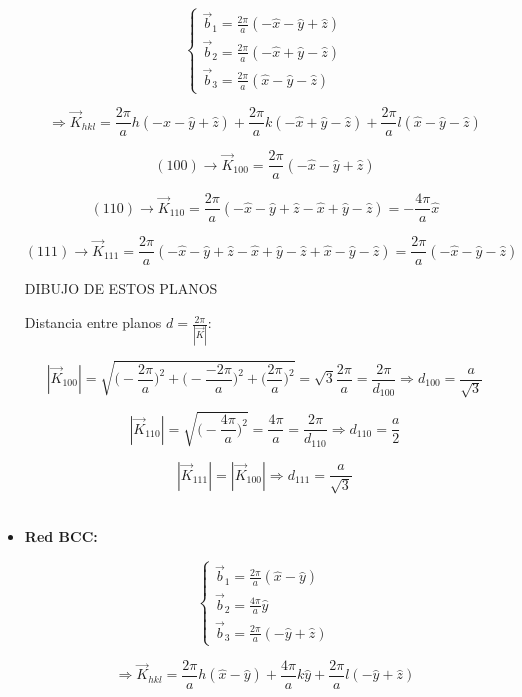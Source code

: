 \documentclass[a4paper]{article}
\begin{document}
\begin{itemize}
$$\begin{cases}
\vec{b}_{1} = \frac{2 \pi}{a}(-\hat{x} - \hat{y} + \hat{z})\\
\vec{b}_{2} = \frac{2 \pi}{a}(-\hat{x} + \hat{y} - \hat{z}) \\
\vec{b}_{3} = \frac{2 \pi}{a}(\hat{x} - \hat{y} - \hat{z})
\end{cases}$$

$$\Rightarrow \vec{K}_{hkl} = \frac{2 \pi}{a}h(-\hat{x} - \hat{y} + \hat{z}) + \frac{2 \pi}{a}k(-\hat{x} + \hat{y} - \hat{z}) + \frac{2 \pi}{a}l(\hat{x} - \hat{y} - \hat{z})$$



$$(100) \rightarrow \vec{K}_{100} = \frac{2 \pi}{a}(-\hat{x} - \hat{y} + \hat{z})$$

$$(110) \rightarrow \vec{K}_{110} = \frac{2 \pi}{a}(-\hat{x} - \hat{y} + \hat{z} -\hat{x} + \hat{y} - \hat{z}) = -\frac{4 \pi}{a}\hat{x}$$

$$(111) \rightarrow \vec{K}_{111} = \frac{2 \pi}{a}(-\hat{x} - \hat{y} + \hat{z} -\hat{x} + \hat{y} - \hat{z} + \hat{x} - \hat{y} - \hat{z}) = \frac{2 \pi}{a}(-\hat{x} - \hat{y} - \hat{z})$$

DIBUJO DE ESTOS PLANOS

Distancia entre planos $d = \frac{2\pi}{|\vec{K}|}$:

$$| \vec{K}_{100} | = \sqrt{\bigg(-\frac{2 \pi}{a}\bigg)^{2} + \bigg(-\frac{-2 \pi}{a}\bigg)^{2} + \bigg(\frac{2 \pi}{a}\bigg)^{2}} =  \sqrt{3} \frac{2\pi}{a} =  \frac{2\pi}{d_{100}} \Rightarrow d_{100} = \frac{a}{\sqrt{3}}$$

$$| \vec{K}_{110} | = \sqrt{\bigg(-\frac{4 \pi}{a}\bigg)^{2}} = \frac{4\pi}{a} =  \frac{2\pi}{d_{110}} \Rightarrow d_{110} = \frac{a}{2}$$

$$| \vec{K}_{111} | = | \vec{K}_{100} | \Rightarrow d_{111} = \frac{a}{\sqrt{3}}$$
\\

\item \textbf{Red BCC:}

$$\begin{cases}
\vec{b}_{1} = \frac{2 \pi}{a}(\hat{x} - \hat{y})\\
\vec{b}_{2} = \frac{4 \pi}{a}\hat{y}\\
\vec{b}_{3} = \frac{2 \pi}{a}(- \hat{y} + \hat{z})
\end{cases}$$

$$\Rightarrow \vec{K}_{hkl} = \frac{2 \pi}{a}h(\hat{x} - \hat{y}) + \frac{4 \pi}{a}k\hat{y} + \frac{2 \pi}{a}l(-\hat{y} + \hat{z})$$




\end{itemize}
\end{document}
